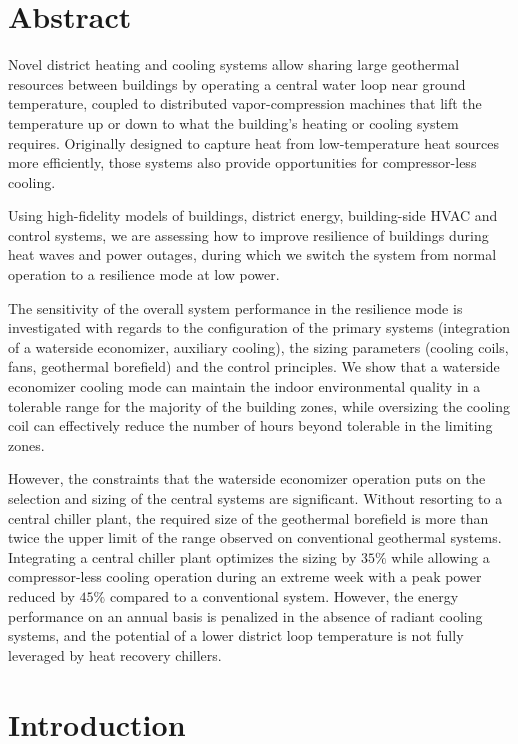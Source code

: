 \section{Abstract} \label{sec:abstract}

Novel district heating and cooling systems allow sharing large geothermal resources between buildings by operating a central water loop near ground temperature, coupled to distributed vapor-compression machines that lift the temperature up or down to what the building’s heating or cooling system requires.
Originally designed to capture heat from low-temperature heat sources more efficiently, those systems also provide opportunities for compressor-less cooling.

Using high-fidelity models of buildings, district energy, building-side HVAC and control systems, we are assessing how to improve resilience of buildings during heat waves and power outages, during which we switch the system from normal operation to a resilience mode at low power.

The sensitivity of the overall system performance in the resilience mode is investigated with regards to the configuration of the primary systems (integration of a waterside economizer, auxiliary cooling), the sizing parameters (cooling coils, fans, geothermal borefield) and the control principles.
We show that a waterside economizer cooling mode can maintain the indoor environmental quality in a tolerable range for the majority of the building zones, while oversizing the cooling coil can effectively reduce the number of hours beyond tolerable in the limiting zones.

However, the constraints that the waterside economizer operation puts on the selection and sizing of the central systems are significant. Without resorting to a central chiller plant, the required size of the geothermal borefield is more than twice the upper limit of the range observed on conventional geothermal systems. Integrating a central chiller plant optimizes the sizing by $35\%$ while allowing a compressor-less cooling operation during an extreme week with a peak power reduced by $45\%$ compared to a conventional system.
However, the energy performance on an annual basis is penalized in the absence of radiant cooling systems, and the potential of a lower district loop temperature is not fully leveraged by heat recovery chillers.


\section{Introduction} \label{sec:introduction}

